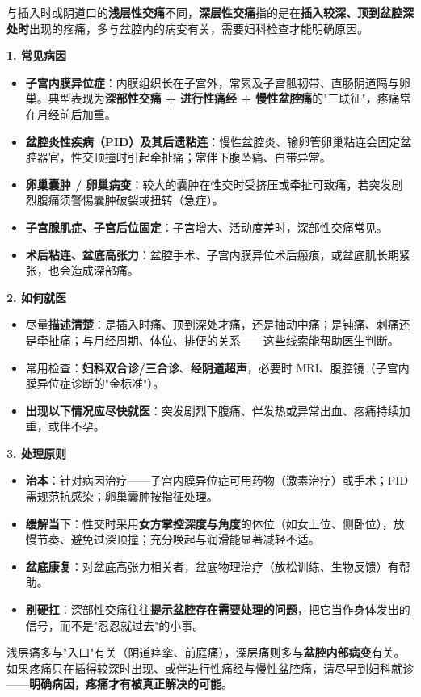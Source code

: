 与插入时或阴道口的\textbf{浅层性交痛}不同，\textbf{深层性交痛}指的是在\textbf{插入较深、顶到盆腔深处时}出现的疼痛，多与盆腔内的病变有关，需要妇科检查才能明确原因。

\vspace{0.5em}
\noindent\textbf{1. 常见病因}

\begin{itemize}
	\item \textbf{子宫内膜异位症}：内膜组织长在子宫外，常累及子宫骶韧带、直肠阴道隔与卵巢。典型表现为\textbf{深部性交痛 + 进行性痛经 + 慢性盆腔痛}的"三联征"，疼痛常在月经前后加重。
	\item \textbf{盆腔炎性疾病（PID）及其后遗粘连}：慢性盆腔炎、输卵管卵巢粘连会固定盆腔器官，性交顶撞时引起牵扯痛；常伴下腹坠痛、白带异常。
	\item \textbf{卵巢囊肿 / 卵巢病变}：较大的囊肿在性交时受挤压或牵扯可致痛，若突发剧烈腹痛须警惕囊肿破裂或扭转（急症）。
	\item \textbf{子宫腺肌症、子宫后位固定}：子宫增大、活动度差时，深部性交痛常见。
	\item \textbf{术后粘连、盆底高张力}：盆腔手术、子宫内膜异位术后瘢痕，或盆底肌长期紧张，也会造成深部痛。
\end{itemize}

\noindent\textbf{2. 如何就医}

\begin{itemize}
	\item 尽量\textbf{描述清楚}：是插入时痛、顶到深处才痛，还是抽动中痛；是钝痛、刺痛还是牵扯痛；与月经周期、体位、排便的关系——这些线索能帮助医生判断。
	\item 常用检查：\textbf{妇科双合诊/三合诊}、\textbf{经阴道超声}，必要时 MRI、腹腔镜（子宫内膜异位症诊断的"金标准"）。
	\item \textbf{出现以下情况应尽快就医}：突发剧烈下腹痛、伴发热或异常出血、疼痛持续加重，或伴不孕。
\end{itemize}

\noindent\textbf{3. 处理原则}

\begin{itemize}
	\item \textbf{治本}：针对病因治疗——子宫内膜异位症可用药物（激素治疗）或手术；PID 需规范抗感染；卵巢囊肿按指征处理。
	\item \textbf{缓解当下}：性交时采用\textbf{女方掌控深度与角度}的体位（如女上位、侧卧位），放慢节奏、避免过深顶撞；充分唤起与润滑能显著减轻不适。
	\item \textbf{盆底康复}：对盆底高张力相关者，盆底物理治疗（放松训练、生物反馈）有帮助。
	\item \textbf{别硬扛}：深部性交痛往往\textbf{提示盆腔存在需要处理的问题}，把它当作身体发出的信号，而不是"忍忍就过去"的小事。
\end{itemize}

\begin{tcolorbox}[colback=pink!5!white,colframe=red!50!black,title=贴心小叮咛]
浅层痛多与"入口"有关（阴道痉挛、前庭痛），深层痛则多与\textbf{盆腔内部病变}有关。如果疼痛只在插得较深时出现、或伴进行性痛经与慢性盆腔痛，请尽早到妇科就诊——\textbf{明确病因，疼痛才有被真正解决的可能}。
\end{tcolorbox}
